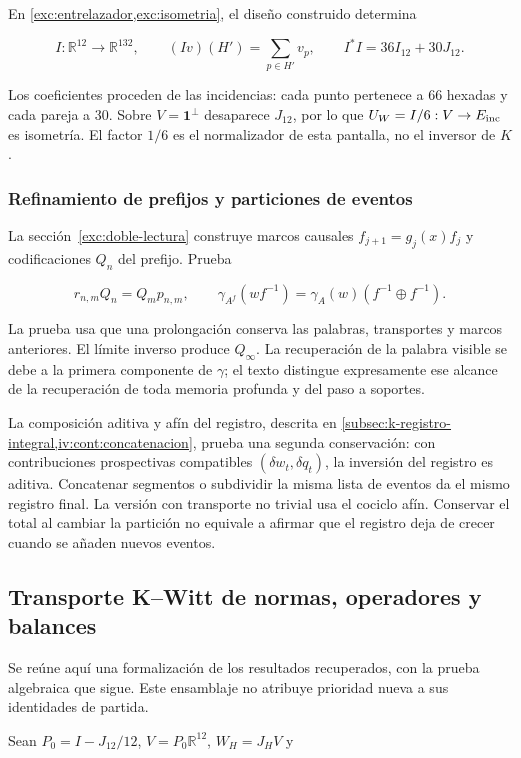 En \cref{exc:entrelazador,exc:isometria}, el diseño construido determina

\[
I:\mathbb R^{12}\to\mathbb R^{132},\qquad
(Iv)(H')=\sum_{p\in H'}v_p,\qquad I^*I=36I_{12}+30J_{12}.
\]

Los coeficientes proceden de las incidencias: cada punto pertenece a 66 hexadas y cada pareja a 30. Sobre \(V=\mathbf1^\perp\) desaparece \(J_{12}\), por lo que \(U_W=I/6:V\to E_{\rm inc}\) es isometría. El factor \(1/6\) es el normalizador de esta pantalla, no el inversor de \(K\).

\subsubsection{Refinamiento de prefijos y particiones de eventos}

La sección~\ref{exc:doble-lectura} construye marcos causales \(f_{j+1}=g_j(x)f_j\) y codificaciones \(Q_n\) del prefijo. Prueba

\[
r_{n,m}Q_n=Q_mp_{n,m},\qquad
\gamma_{A^f}(wf^{-1})=\gamma_A(w)(f^{-1}\oplus f^{-1}).
\]

La prueba usa que una prolongación conserva las palabras, transportes y marcos anteriores. El límite inverso produce \(Q_\infty\). La recuperación de la palabra visible se debe a la primera componente de \(\gamma\); el texto distingue expresamente ese alcance de la recuperación de toda memoria profunda y del paso a soportes.

La composición aditiva y afín del registro, descrita en \cref{subsec:k-registro-integral,iv:cont:concatenacion}, prueba una segunda conservación: con contribuciones prospectivas compatibles \((\delta w_t,\delta q_t)\), la inversión del registro es aditiva. Concatenar segmentos o subdividir la misma lista de eventos da el mismo registro final. La versión con transporte no trivial usa el cociclo afín. Conservar el total al cambiar la partición no equivale a afirmar que el registro deja de crecer cuando se añaden nuevos eventos.

\subsection{Transporte K–Witt de normas, operadores y balances}\label{nuc04:kwitt}

Se reúne aquí una formalización de los resultados recuperados, con la prueba algebraica que sigue. Este ensamblaje no atribuye prioridad nueva a sus identidades de partida.

Sean \(P_0=I-J_{12}/12\), \(V=P_0\mathbb R^{12}\), \(W_H=J_HV\) y

